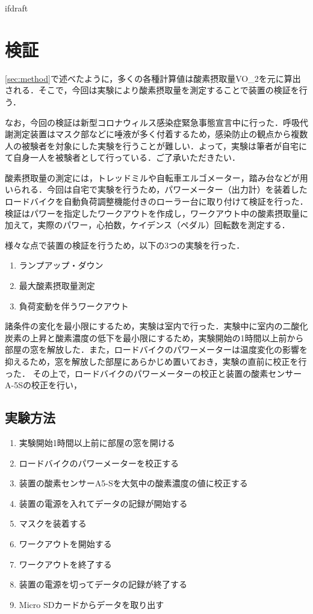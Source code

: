 \expandafter\ifx\csname ifdraft\endcsname\relax
 
\fi

\section{検証}

\ref{sec:method}で述べたように，多くの各種計算値は酸素摂取量VO_2を元に算出される．そこで，今回は実験により酸素摂取量を測定することで装置の検証を行う．

なお，今回の検証は新型コロナウィルス感染症緊急事態宣言中に行った．呼吸代謝測定装置はマスク部などに唾液が多く付着するため，感染防止の観点から複数人の被験者を対象にした実験を行うことが難しい．よって，実験は筆者が自宅にて自身一人を被験者として行っている．ご了承いただきたい．

酸素摂取量の測定には，トレッドミルや自転車エルゴメーター，踏み台などが用いられる．今回は自宅で実験を行うため，パワーメーター（出力計）を装着したロードバイクを自動負荷調整機能付きのローラー台に取り付けて検証を行った．
検証はパワーを指定したワークアウトを作成し，ワークアウト中の酸素摂取量に加えて，実際のパワー，心拍数，ケイデンス（ペダル）回転数を測定する．

様々な点で装置の検証を行うため，以下の3つの実験を行った．

\begin{enumerate}
  \item ランプアップ・ダウン
  \item 最大酸素摂取量測定
  \item 負荷変動を伴うワークアウト
\end{enumerate}

諸条件の変化を最小限にするため，実験は室内で行った．実験中に室内の二酸化炭素の上昇と酸素濃度の低下を最小限にするため，実験開始の1時間以上前から部屋の窓を解放した．また，ロードバイクのパワーメーターは温度変化の影響を抑えるため，窓を解放した部屋にあらかじめ置いておき，実験の直前に校正を行った．
その上で，ロードバイクのパワーメーターの校正と装置の酸素センサーA-5Sの校正を行い，

\subsection{実験方法}

\begin{enumerate}
  \item 実験開始1時間以上前に部屋の窓を開ける
  \item ロードバイクのパワーメーターを校正する
  \item 装置の酸素センサーA5-Sを大気中の酸素濃度の値に校正する
  \item 装置の電源を入れてデータの記録が開始する
  \item マスクを装着する
  \item ワークアウトを開始する
  \item ワークアウトを終了する
  \item 装置の電源を切ってデータの記録が終了する
  \item Micro SDカードからデータを取り出す
\end{enumerate}

